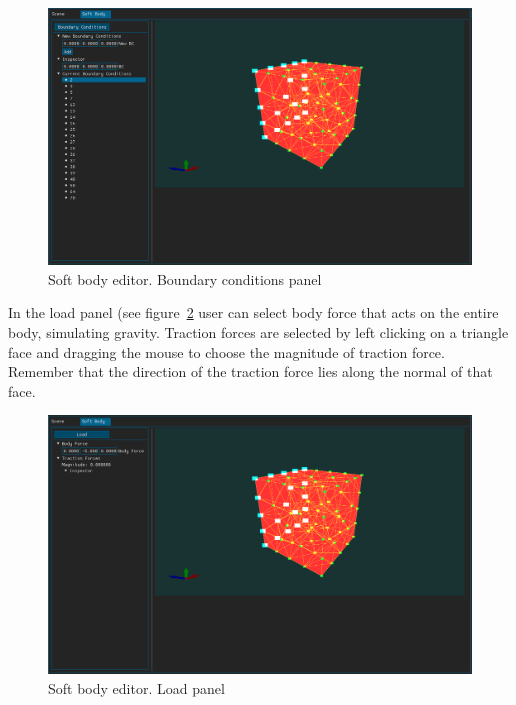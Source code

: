 \documentclass[en]{minipw} %
\begin{document}
\begin{figure}[h!]
\centering
\includegraphics[scale=0.3]{pictures/ifx/ifx_bc.png}
\caption[Soft body editor. Boundary conditions panel]{Soft body editor. Boundary conditions panel}
\label{fig:ifx_bc}
\end{figure}

In the load panel (see figure~\ref{fig:ifx_load} user can select body force that acts on the entire body, simulating gravity. Traction forces are selected by left clicking on a triangle face and dragging the mouse to choose the magnitude of traction force. Remember that the direction of the traction force lies along the normal of that face.

\begin{figure}[h!]
\centering
\includegraphics[scale=0.3]{pictures/ifx/ifx_load.png}
\caption[Soft body editor. Load panel]{Soft body editor. Load panel}
\label{fig:ifx_load}
\end{figure}
\end{document}
